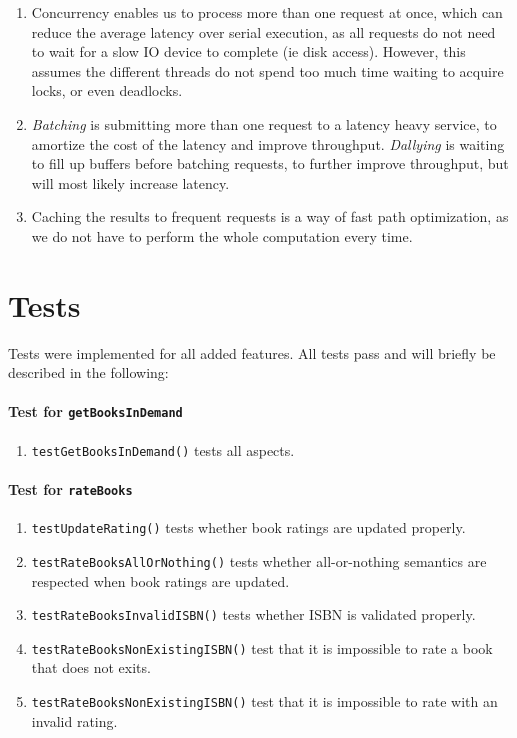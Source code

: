 \documentclass[11pt,a4paper,english]{article}
\begin{document}
\begin{enumerate}
\item Concurrency enables us to process more than one request at once, which can
  reduce the average latency over serial execution, as all requests do not need
  to wait for a slow IO device to complete (ie disk access). However, this
  assumes the different threads do not spend too much time waiting to acquire
  locks, or even deadlocks.

\item \emph{Batching} is submitting more than one request to a latency heavy
  service, to amortize the cost of the latency and improve
  throughput. \emph{Dallying} is waiting to fill up buffers before batching
  requests, to further improve throughput, but will most likely increase
  latency.

\item Caching the results to frequent requests is a way of fast path
  optimization, as we do not have to perform the whole computation every time.
\end{enumerate}

\newpage

\section{Tests}
Tests were implemented for all added features. All tests pass and will briefly be described in the following:
\paragraph{Test for \texttt{getBooksInDemand}}
\begin{enumerate}
\item{\texttt{testGetBooksInDemand()} tests all aspects.}
\end{enumerate}

\paragraph{Test for \texttt{rateBooks}}
\begin{enumerate}
\item{\texttt{testUpdateRating()} tests whether book ratings are updated properly.}
\item{\texttt{testRateBooksAllOrNothing()} tests whether all-or-nothing semantics are respected when book ratings are updated.}
\item{\texttt{testRateBooksInvalidISBN()} tests whether ISBN is validated properly.}
\item{\texttt{testRateBooksNonExistingISBN()} test that it is impossible to rate a book that does not exits.}
\item{\texttt{testRateBooksNonExistingISBN()} test that it is impossible to rate with an invalid rating.}
\end{enumerate}
\end{document}

